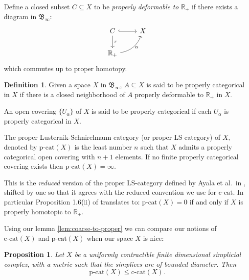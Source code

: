 \documentclass {amsart}
\newcommand {\ccat}     {\text{c-cat}}
\newcommand {\pcat}     {\text{p-cat}}
\newcommand {\Rplus}    {\mathbb{R}_{+}}
\newcommand {\binfty}   {\mathfrak{B}_{\infty}}
\newtheorem   {proposition} [theorem] {Proposition}
\theoremstyle {definition}
\newtheorem   {definition}  [theorem] {Definition}
\begin{document}
Define a closed subset \( C \subseteq X \) to be \emph{properly deformable to
    \( \Rplus\)} if there exists a diagram in \( \binfty \):
\begin{equation*}
    \begin{tikzcd}
        C \arrow[r, hook] \arrow[d, "r"] & X \\
        \Rplus  \arrow[ur, bend right, "\alpha" right]
    \end{tikzcd}
\end{equation*}
which commutes up to proper homotopy.

\begin{definition}
    \label{def:p-cat}
    Given a space \( X \) in \( \binfty \), \( A \subseteq X \) is said to be
    properly categorical in \( X \) if there is a closed neighborhood of \( A \)
    properly deformable to \( \Rplus \) in \( X \).

    An open covering \( \{ U_{\alpha} \} \) of \( X \) is said to be properly
    categorical if each \( U_{\alpha} \) is properly categorical in \( X \).

    The proper Lusternik-Schnirelmann category (or proper LS category) of \( X
    \), denoted by \( \pcat(X) \) is the least number \( n \) such that \( X \)
    admits a properly categorical open covering with \( n+1 \) elements. If no
    finite properly categorical covering exists then \( \pcat(X) = \infty \).
\end{definition}

This is the \emph{reduced} version of the proper LS-category defined by Ayala et
al.\ in \cite{ayalaLusternikSchnirelmannInvariantsProper1992}, shifted by one so
that it agrees with the reduced convention we use for \( \ccat \). In particular
Proposition 1.6(ii) of \cite{ayalaLusternikSchnirelmannInvariantsProper1992}
translates to: \( \pcat(X) = 0 \) if and only if \( X \) is properly homotopic to
\( \Rplus \).

Using our lemma \ref{lem:coarse-to-proper} we can compare our notions of \(
\ccat(X) \) and \( \pcat(X) \) when our space \( X \) is nice:

\begin{proposition} \label{prop:pcat-ccat-ineq}
    Let \( X \) be a uniformly contractible finite dimensional simplicial complex,
    with a metric such that the simplices are of bounded diameter. Then
    \[
        \pcat(X) \leq \ccat(X).
    \]
\end{proposition}
\end{document}
